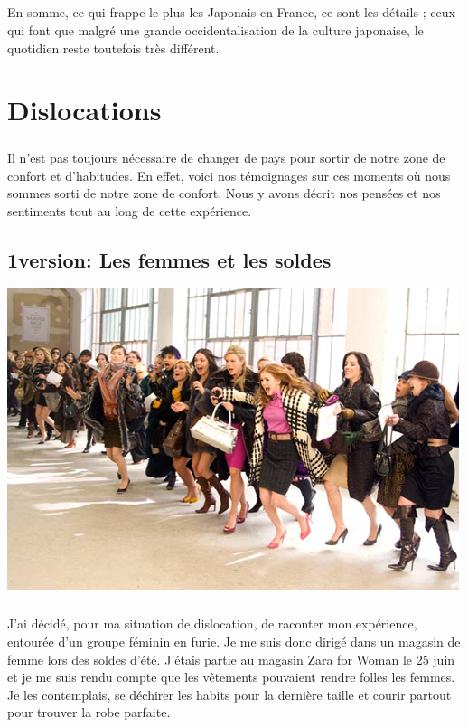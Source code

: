 \paragraph{} En somme, ce qui frappe le plus les Japonais en France, ce sont
les détails ; ceux qui font que malgré une grande occidentalisation de la
culture japonaise, le quotidien reste toutefois très différent.


\chapter{Dislocations}

\paragraph{} Il n'est pas toujours nécessaire de changer de pays pour sortir de
notre zone de confort et d'habitudes. En effet, voici nos témoignages sur ces
moments où nous sommes sorti de notre zone de confort. Nous y avons décrit nos
pensées et nos sentiments tout au long de cette expérience.

\section{1\iere version: Les femmes et les soldes}

\begin{center}
	\includegraphics[scale=0.7]{solde.jpg}
\end{center}

\paragraph{} J'ai décidé, pour ma situation de dislocation, de raconter mon
expérience, entourée d'un groupe féminin en furie. Je me suis donc dirigé dans
un magasin de femme lors des soldes d'été. J'étais partie au magasin Zara for
Woman le 25 juin et je me suis rendu compte que les vêtements pouvaient rendre
folles les femmes. Je les contemplais, se déchirer les habits pour la dernière
taille et courir partout pour trouver la robe parfaite.

